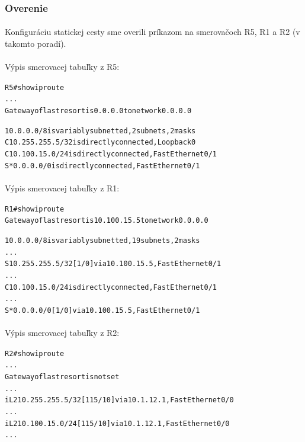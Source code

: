 \documentclass[12pt,twoside,a4paper]{report}
\begin{document}
\subsubsection{Overenie}
\paragraph{}
Konfiguráciu statickej cesty sme overili príkazom  na smerovačoch R5, R1 a R2 (v takomto poradí).

\paragraph{}
Výpis smerovacej tabuľky z R5:

\noindent
{\selectfont
\begin{small}
\begin{alltt}
R5#show ip route
...
Gateway of last resort is 0.0.0.0 to network 0.0.0.0

     10.0.0.0/8 is variably subnetted, 2 subnets, 2 masks
C       10.255.255.5/32 is directly connected, Loopback0
C       10.100.15.0/24 is directly connected, FastEthernet0/1
S*   0.0.0.0/0 is directly connected, FastEthernet0/1
\end{alltt}
\end{small}
}

\paragraph{}
Výpis smerovacej tabuľky z R1:

\noindent
{\selectfont
\begin{small}
\begin{alltt}
R1#show ip route
Gateway of last resort is 10.100.15.5 to network 0.0.0.0

     10.0.0.0/8 is variably subnetted, 19 subnets, 2 masks
...
S       10.255.255.5/32 [1/0] via 10.100.15.5, FastEthernet0/1
...
C       10.100.15.0/24 is directly connected, FastEthernet0/1
...
S*   0.0.0.0/0 [1/0] via 10.100.15.5, FastEthernet0/1
\end{alltt}
\end{small}
}

\paragraph{}
Výpis smerovacej tabuľky z R2:

\noindent
{\selectfont
\begin{small}
\begin{alltt}
R2#show ip route
...
Gateway of last resort is not set
...
i L2    10.255.255.5/32 [115/10] via 10.1.12.1, FastEthernet0/0
...
i L2    10.100.15.0/24 [115/10] via 10.1.12.1, FastEthernet0/0
...
\end{alltt}
\end{small}
}
\end{document}
